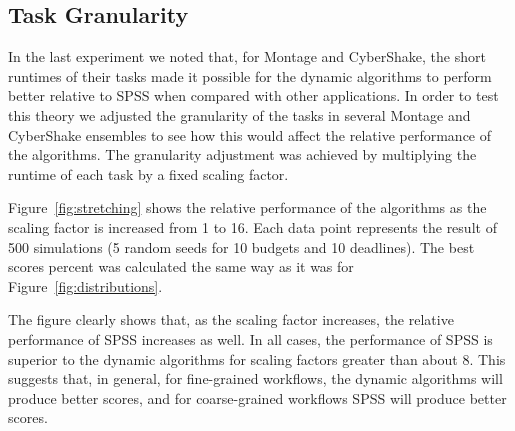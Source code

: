 \documentclass[conference]{IEEEtran}
\begin{document}
\subsection{Task Granularity}

In the last experiment we noted that, for Montage and CyberShake, the short runtimes of their tasks made it possible for the dynamic algorithms to perform better relative to SPSS when compared with other applications. In order to test this theory we adjusted the granularity of the tasks in several Montage and CyberShake ensembles to see how this would affect the relative performance of the algorithms. The granularity adjustment was achieved by multiplying the runtime of each task by a fixed scaling factor.

Figure~\ref{fig:stretching} shows the relative performance of the algorithms as the scaling factor is increased from 1 to 16. Each data point represents the result of 500 simulations (5 random seeds for 10 budgets and 10 deadlines). The best scores percent was calculated the same way as it was for Figure~\ref{fig:distributions}.

The figure clearly shows that, as the scaling factor increases, the relative performance of SPSS increases as well. In all cases, the performance of SPSS is superior to the dynamic algorithms for scaling factors greater than about 8. This suggests that, in general, for fine-grained workflows, the dynamic algorithms will produce better scores, and for coarse-grained workflows SPSS will produce better scores.
\end{document}
